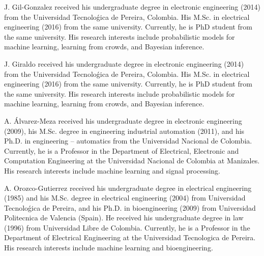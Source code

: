 \documentclass[journal]{IEEEtran}
\begin{document}

\footnotesize

\vspace{-1.0cm}
\begin{IEEEbiographynophoto}{J. Gil-Gonzalez}
received his undergraduate degree in electronic engineering (2014) from the Universidad Tecnoloǵica de Pereira, Colombia. His M.Sc. in electrical engineering (2016) from the same university. Currently, he is PhD student from the same university. His research interests include probabilistic models for machine learning, learning from crowds, and Bayesian inference.
\end{IEEEbiographynophoto}
\vspace{-1.0cm}
\begin{IEEEbiographynophoto}{J. Giraldo}
received his undergraduate degree in electronic engineering (2014) from the Universidad Tecnoloǵica de Pereira, Colombia. His M.Sc. in electrical engineering (2016) from the same university. Currently, he is PhD student from the same university. His research interests include probabilistic models for machine learning, learning from crowds, and Bayesian inference.
\end{IEEEbiographynophoto}
\vspace{-1.0cm}
\begin{IEEEbiographynophoto}{A. Álvarez-Meza}
received his undergraduate degree in electronic engineering (2009), his M.Sc. degree in engineering industrial automation (2011), and his Ph.D. in engineering – automatics from the Universidad Nacional de Colombia. Currently, he is a Professor in the Department of Electrical, Electronic and Computation Engineering at the Universidad Nacional de Colombia at Manizales. His research interests include machine learning and signal processing.
\end{IEEEbiographynophoto}
\vspace{-1.0cm}
\begin{IEEEbiographynophoto}{A. Orozco-Gutierrez}
received his undergraduate degree in electrical engineering (1985) and his M.Sc. degree in electrical engineering (2004) from Universidad Tecnoloǵica de Pereira, and his Ph.D. in bioengineering (2009) from Universidad Politecnica de Valencia (Spain). He received his undergraduate degree in law (1996) from Universidad Libre de Colombia. Currently, he is a Professor in the Department of Electrical Engineering at the Universidad Tecnologica de Pereira. His research interests include machine learning and bioengineering.
\end{IEEEbiographynophoto}
\vspace{-1.0cm}
\end{document}
